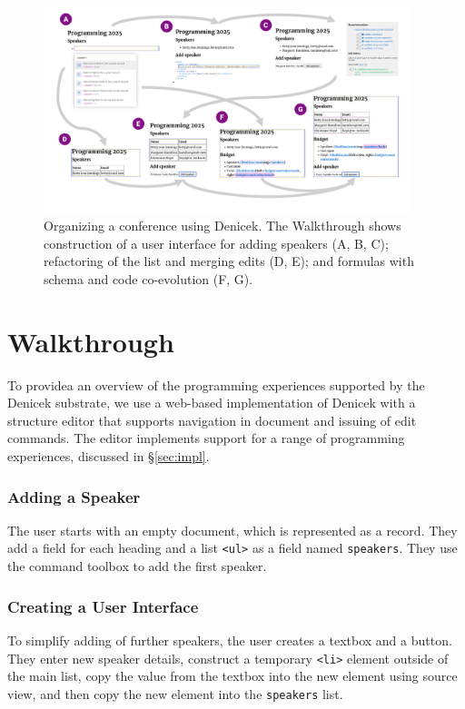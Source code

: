 \documentclass[sigconf]{acmart}
\newcommand*\circled[1]{\textnormal{\footnotesize\sffamily\bfseries\protect\tikz[baseline=(char.base)]{
  \node[shape=circle,fill=black,text=white,draw,inner sep=1pt] (char) {#1};}}}
\begin{document}
\begin{figure}[t]
\vspace{-0.5em}
\includegraphics[width=0.95\textwidth,clip,trim=1cm 1cm 1cm 0.5cm]{fig/walkthrough.pdf}
\vspace{-1em}
\caption{Organizing a conference using Denicek. The Walkthrough shows construction of a user
  interface for adding speakers (A, B, C); refactoring of the list and merging edits (D, E); and
  formulas with schema and code co-evolution (F, G).}
\label{fig:walkthrough}
\end{figure}

\newpage


\section{Walkthrough}
To providea an overview of the programming experiences supported by the Denicek
substrate, we use a web-based implementation of Denicek with a structure
editor that supports navigation in document and issuing of edit commands. The editor
implements support for a range of programming experiences, discussed in \S\ref{sec:impl}.

\subsubsection*{\circled{A} Adding a Speaker}
The user starts with an empty document, which is represented as a record. They add a field for
each heading and a list \Verb_<ul>_ as a field named \Verb_speakers_. They use the command
toolbox to add the first speaker.

\subsubsection*{\circled{B} Creating a User Interface} To simplify adding of
further speakers, the user creates a textbox and a button. They enter new speaker
details, construct a temporary \Verb_<li>_ element outside of the main list, copy the value
from the textbox into the new element using source view, and then copy the new element into the
\Verb_speakers_ list.
\end{document}

